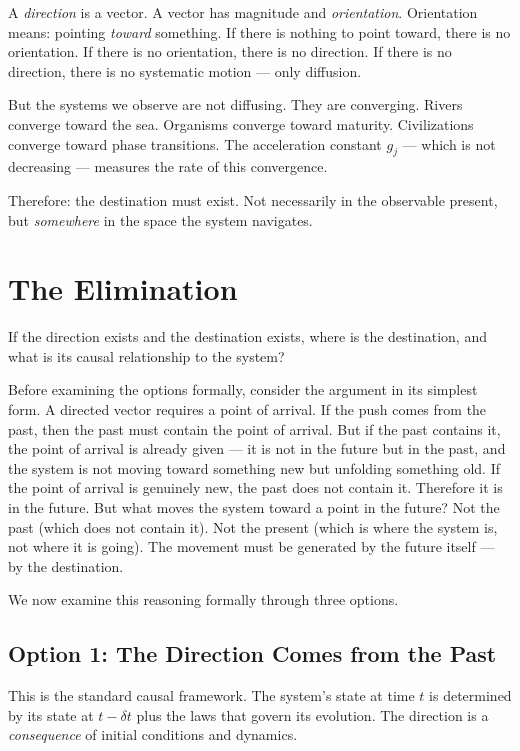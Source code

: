 \documentclass[12pt,a4paper]{article}
\newcommand{\gj}{g_j}
\begin{document}
A \emph{direction} is a vector. A vector has magnitude and \emph{orientation}. Orientation means: pointing \emph{toward} something. If there is nothing to point toward, there is no orientation. If there is no orientation, there is no direction. If there is no direction, there is no systematic motion --- only diffusion.

But the systems we observe are not diffusing. They are converging. Rivers converge toward the sea. Organisms converge toward maturity. Civilizations converge toward phase transitions. The acceleration constant $\gj$ --- which is not decreasing --- measures the rate of this convergence.

Therefore: the destination must exist. Not necessarily in the observable present, but \emph{somewhere} in the space the system navigates.


\section{The Elimination}

If the direction exists and the destination exists, where is the destination, and what is its causal relationship to the system?

Before examining the options formally, consider the argument in its simplest form. A directed vector requires a point of arrival. If the push comes from the past, then the past must contain the point of arrival. But if the past contains it, the point of arrival is already given --- it is not in the future but in the past, and the system is not moving toward something new but unfolding something old. If the point of arrival is genuinely new, the past does not contain it. Therefore it is in the future. But what moves the system toward a point in the future? Not the past (which does not contain it). Not the present (which is where the system is, not where it is going). The movement must be generated by the future itself --- by the destination.

We now examine this reasoning formally through three options.

\subsection{Option 1: The Direction Comes from the Past}

This is the standard causal framework. The system's state at time $t$ is determined by its state at $t - \delta t$ plus the laws that govern its evolution. The direction is a \emph{consequence} of initial conditions and dynamics.
\end{document}
